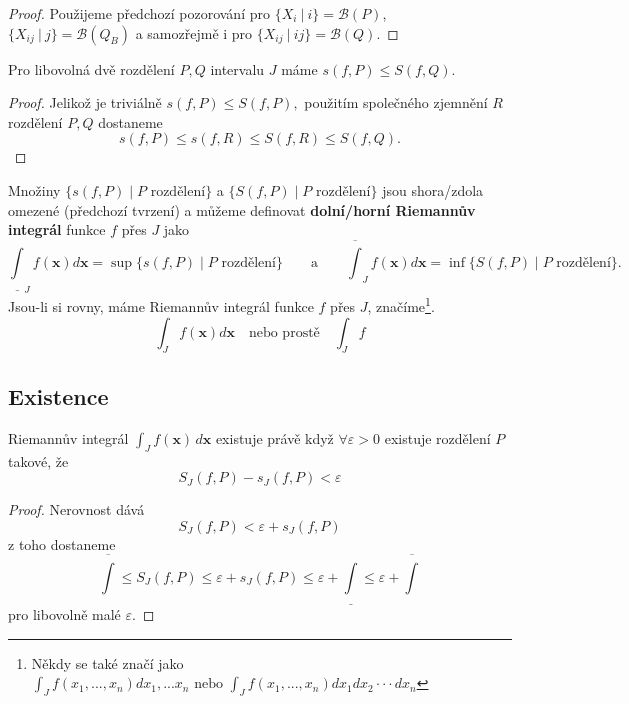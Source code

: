 \documentclass[../main.tex]{subfiles}
\begin{document}
\begin{proof}
	Použijeme předchozí pozorování pro $\{X_i\ |\ i\} = \mathcal{B}(P)$, $\{X_{ij}\ |\ j\} = \mathcal{B}(Q_B)$ a samozřejmě
	i pro $\{X_{ij}\ |\ ij\} = \mathcal{B}(Q).$
\end{proof}

\begin{lemma}
	Pro libovolná dvě rozdělení $P,Q$ intervalu $J$ máme $s(f,P) \leq S(f,Q)$.
\end{lemma}

\begin{proof}
	Jelikož je triviálně $s(f,P) \leq S(f,P),$ použitím společného zjemnění $R$ rozdělení $P,Q$ dostaneme
	\[s(f,P) \leq s(f,R) \leq S(f,R) \leq S(f,Q).\]
\end{proof}

\begin{definition}
	Množiny $\{s(f,P) \mid P \text{ rozdělení}\}$ a $\{S(f,P) \mid P \text{ rozdělení}\}$ jsou shora/zdola omezené (předchozí tvrzení) a můžeme definovat \textbf{dolní/horní Riemannův integrál} funkce $f$ přes $J$ jako
	\[\underline{\int}_J f(\textbf{x})d\textbf{x} = \sup\{s(f,P) \mid P \text{ rozdělení}\} \qquad \text{a} \qquad
	\overline{\int}_J f(\textbf{x})d\textbf{x} = \inf\{S(f,P) \mid P \text{ rozdělení}\}.\]
	Jsou-li si rovny, máme Riemannův integrál funkce $f$ přes $J$, značíme\footnote{Někdy se také značí jako \(\int_J f(x_1,...,x_n)dx_1,...x_n \text{ nebo } \int_J f(x_1,...,x_n)dx_1 dx_2\cdot \cdot \cdot dx_n\)}.
	$$\int_J f(\textbf{x})d\textbf{x} \quad \text{nebo prostě} \quad \int_J f $$
\end{definition}

\subsection{Existence}
\begin{theorem}
	Riemannův integrál $\int_{J} f(\mathbf{x}) \,d\mathbf{x}$ existuje právě když
	$\forall \varepsilon > 0$ existuje rozdělení $P$ takové, že
	\[ S_J(f,P) - s_J(f,P) < \varepsilon \]
\end{theorem}

\begin{proof}
	Nerovnost dává \[ S_J(f,P) < \varepsilon + s_J(f,P) \]
	z toho dostaneme
	\[ \overline{\int} \leq S_J(f,P) \leq \varepsilon + s_J(f,P) \leq \varepsilon + \underline{\int} \leq
	\varepsilon + \overline{\int}\]
	pro libovolně malé $\varepsilon$.
\end{proof}
\end{document}
